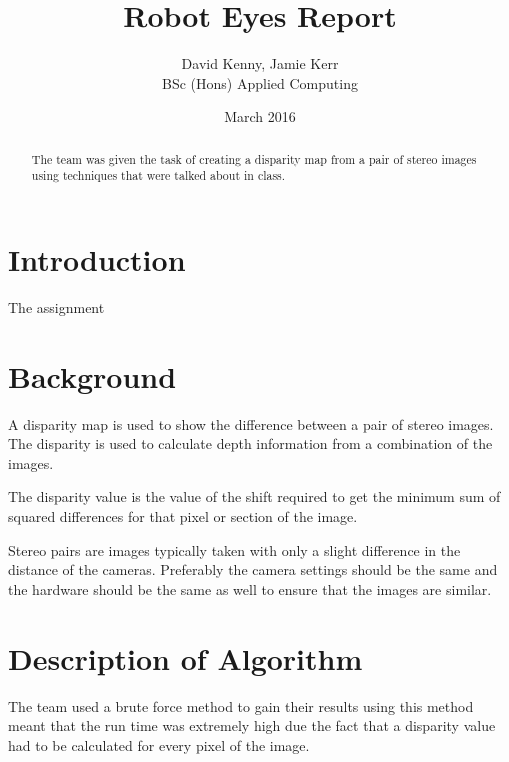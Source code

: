 \documentclass[twocolumn]{article}
\title{Robot Eyes Report}
\author{David Kenny, Jamie Kerr\\BSc (Hons) Applied Computing}
\date{March 2016}
\begin{document}
\maketitle


\begin{abstract}

The team was given the task of creating a disparity map from a pair of stereo images using techniques that were talked about in class. 

\end{abstract}


\section{Introduction}
\vspace{-1ex}

The assignment 



\section{Background}
\vspace{-1ex}

A disparity map \cite{disparitymap} is used to show the difference between a pair of stereo images. The disparity is used to calculate depth information from a combination of the images. 

The disparity value is the value of the shift required to get the minimum sum of squared differences for that pixel or section of the image. 

Stereo pairs are images typically taken with only a slight difference in the distance of the cameras. Preferably the camera settings should be the same and the hardware should be the same as well to ensure that the images are similar. 

\section{Description of Algorithm}
\vspace{-1ex}

The team used a brute force method to gain their results using this method meant that the run time was extremely high due the fact that a disparity value had to be calculated for every pixel of the image. 
\end{document}
